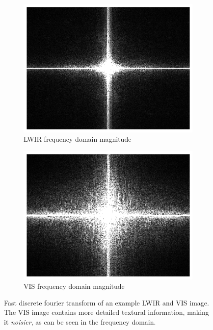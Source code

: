 \documentclass{l4proj}
\begin{document}
\begin{figure}[ht]
\begin{subfigure}[h!]{0.4\textwidth}
    \includegraphics[width=\textwidth]{images/fourier/lwir_freq}
    \caption{LWIR frequency domain magnitude}
    \label{fig:fourier_lwir_freq}
  \end{subfigure}
  \begin{subfigure}[h!]{0.4\textwidth}
      \includegraphics[width=\textwidth]{images/fourier/gray_freq}
      \caption{VIS frequency domain magnitude}
      \label{fig:fourier_vis_freq}
    \end{subfigure}
  \caption{Fast discrete fourier transform of an example LWIR and VIS image. The VIS image contains more detailed textural information, making it \textit{noisier}, as can be seen in the frequency domain.}
  \label{fig:fourier}
\end{figure}
\end{document}
